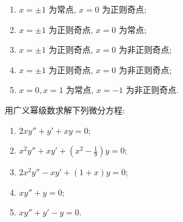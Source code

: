 \begin{solution}
  \begin{enumerate}[(1)]
    \item $x=\pm 1$ 为常点, $x=0$ 为正则奇点;
    \item $x=\pm 1$ 为正则奇点, $x=0$ 为常点;
    \item $x=\pm 1$ 为正则奇点, $x=0$ 为非正则奇点;
    \item $x=\pm 1$ 为正则奇点, $x=0$ 为非正则奇点;
    \item $x=0,x=1$ 为常点, $x=-1$ 为非正则奇点.\qedhere
  \end{enumerate}
\end{solution}



\begin{exercise}
  用广义幂级数求解下列微分方程:
  \begin{enumerate}[(1)]
  \item $2xy''+y'+xy=0$;
  \item $x^2y''+xy'+\left(x^2-\frac{1}{9}\right)y=0$;
  \item $2x^2y''-xy'+(1+x)y=0$;
  \item $xy''+y=0$;
  \item $xy''+y'-y=0$.
  \end{enumerate}
\end{exercise}


